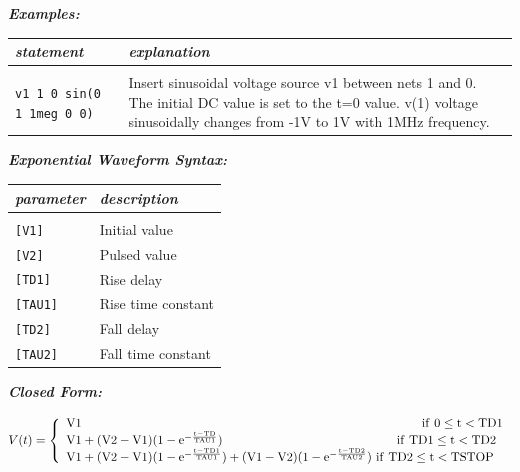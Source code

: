 \textbf{\textit{Examples:}}

\begin{longtable}{l l}
\textit{statement} & \textit{explanation} \\ \hline \\ \vspace{-0.8\parskip} 
\begin{minipage}{15em}\texttt{v1 1 0 sin(0 1 1meg 0 0)}\end{minipage}  
& 
\begin{minipage}{15em}{\small Insert sinusoidal voltage source v1 between nets 1 and 0. The initial DC value is set to the t=0 value. v(1) voltage sinusoidally changes from -1V to 1V with 1MHz frequency.}\end{minipage}  
\end{longtable}

\textbf{\textit{Exponential Waveform Syntax:}}


\begin{longtable}{l l}
\textit{parameter} & \textit{description} \\ \hline \\ \vspace{-0.8\parskip}
\texttt{[V1]} & Initial value \\
\texttt{[V2]} & Pulsed value \\
\texttt{[TD1]} & Rise delay \\
\texttt{[TAU1]} & Rise time constant \\
\texttt{[TD2]} & Fall delay \\
\texttt{[TAU2]} & Fall time constant
\end{longtable}

\textbf{\textit{Closed Form:}}

  \[
    V(t)=\left\{
                \begin{array}{l l}
                  \rm{V1} \hspace{3.8in} \rm{if\ }0\leq t<\rm{TD1}\\
                  \rm{V1}+(\rm{V2}-\rm{V1})(1-e^{-\frac{t-\rm{TD}}{\rm{TAU1}}})\hspace{1.9in}\rm{\ if\ TD1}\leq t<\rm{TD2}\\
									\rm{V1}+(\rm{V2}-\rm{V1})(1-e^{-\frac{t-\rm{TD1}}{\rm{TAU1}}})+(\rm{V1}-\rm{V2})(1-e^{-\frac{t-\rm{TD2}}{\rm{TAU2}}})\rm{\ if\ TD2}\leq t<\rm{TSTOP}
                \end{array}
              \right.
  \]

